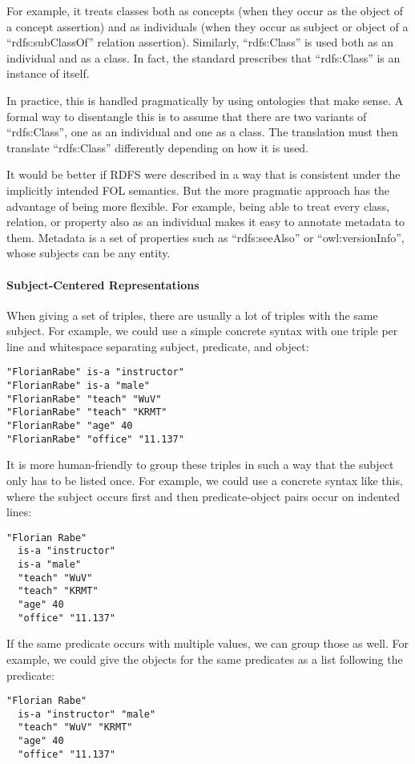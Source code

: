 For example, it treats classes both as concepts (when they occur as the object of a concept assertion) and as individuals (when they occur as subject or object of a \enquote{rdfs:subClassOf} relation assertion).
Similarly, \enquote{rdfs:Class} is used both as an individual and as a class.
In fact, the standard prescribes that \enquote{rdfs:Class} is an instance of itself.

In practice, this is handled pragmatically by using ontologies that make sense.
A formal way to disentangle this is to assume that there are two variants of \enquote{rdfs:Class}, one as an individual and one as a class.
The translation must then translate \enquote{rdfs:Class} differently depending on how it is used.

It would be better if RDFS were described in a way that is consistent under the implicitly intended FOL semantics.
But the more pragmatic approach has the advantage of being more flexible.
For example, being able to treat every class, relation, or property also as an individual makes it easy to annotate metadata to them.
Metadata is a set of properties such as \enquote{rdfs:seeAlso} or \enquote{owl:versionInfo}, whose subjects can be any entity.


\paragraph{Subject-Centered Representations}
When giving a set of triples, there are usually a lot of triples with the same subject.
For example, we could use a simple concrete syntax with one triple per line and whitespace separating subject, predicate, and object:
\begin{lstlisting}
"FlorianRabe" is-a "instructor"
"FlorianRabe" is-a "male"
"FlorianRabe" "teach" "WuV"
"FlorianRabe" "teach" "KRMT"
"FlorianRabe" "age" 40
"FlorianRabe" "office" "11.137"
\end{lstlisting}

It is more human-friendly to group these triples in such a way that the subject only has to be listed once.
For example, we could use a concrete syntax like this, where the subject occurs first and then predicate-object pairs occur on indented lines:
\begin{lstlisting}
"Florian Rabe"
  is-a "instructor"
  is-a "male"
  "teach" "WuV"
  "teach" "KRMT"
  "age" 40
  "office" "11.137"
\end{lstlisting}

If the same predicate occurs with multiple values, we can group those as well.
For example, we could give the objects for the same predicates as a list following the predicate:
\begin{lstlisting}
"Florian Rabe"
  is-a "instructor" "male"
  "teach" "WuV" "KRMT"
  "age" 40
  "office" "11.137"
\end{lstlisting}

